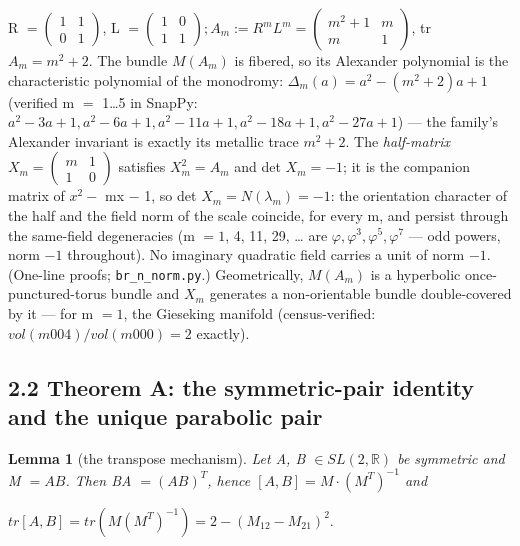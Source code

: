\documentclass[11pt]{article}
\theoremstyle{plain}
\newtheorem{lemma}[theorem]{Lemma}
\theoremstyle{definition}
\theoremstyle{remark}
\begin{document}
R \(= \left(\begin{smallmatrix}1 & 1\\0 & 1\end{smallmatrix}\right)\), L \(= \left(\begin{smallmatrix}1 & 0\\1 & 1\end{smallmatrix}\right); A_{m} := R^{m} L^{m} = \left(\begin{smallmatrix}m^{2}+1 & m\\m & 1\end{smallmatrix}\right)\), tr \(A_{m} = m^{2}+2\). The bundle \(M(A_{m})\) is fibered, so its Alexander polynomial is the characteristic polynomial of the monodromy: \textbf{\(\Delta _{m}(a) = a^{2} - (m^{2}+2)a + 1\)} (verified m \(=\) 1…5 in SnapPy: \(a^{2}-3a+1, a^{2}-6a+1, a^{2}-11a+1, a^{2}-18a+1, a^{2}-27a+1\)) — the family's Alexander invariant is exactly its metallic trace \(m^{2}+2\). The \emph{half-matrix} \(X_{m} = \left(\begin{smallmatrix}m & 1\\1 & 0\end{smallmatrix}\right)\) satisfies \(X_{m}^{2} = A_{m}\) and det \(X_{m} = -1\); it is the companion matrix of \(x^{2} -\) mx \(-\) 1, so det \(X_{m} = N(\lambda _{m}) = -1\): the orientation character of the half and the field norm of the scale coincide, for every m, and persist through the same-field degeneracies (m \(= 1\), 4, 11, 29, … are \(\varphi , \varphi ^{3}, \varphi ^{5}, \varphi ^{7}\) — odd powers, norm \(-1\) throughout). No imaginary quadratic field carries a unit of norm \(-1\). (One-line proofs; \texttt{br\_n\_norm.py}.) Geometrically, \(M(A_{m})\) is a hyperbolic once-punctured-torus bundle and \(X_{m}\) generates a non-orientable bundle double-covered by it — for m \(= 1\), the Gieseking manifold (census-verified: \(vol(m004)/vol(m000) = 2\) exactly).

\subsection{2.2 Theorem A: the symmetric-pair identity and the unique parabolic pair}

\begin{lemma}[the transpose mechanism]
Let A, B \(\in  SL(2,\mathbb{R})\) be symmetric and M \(= AB\). Then BA \(= (AB)^{T}\), hence \([A,B] = M\cdot (M^{T})^{-1}\) and
\end{lemma}

\(tr[A,B] = tr(M (M^{T})^{-1}) = 2 - (M_{12} - M_{21})^{2}\).
\end{document}
